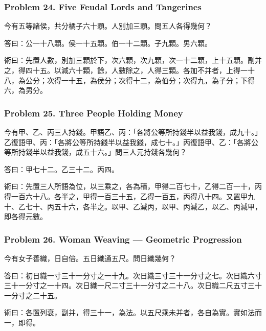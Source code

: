 \documentclass[11pt,a4paper]{article}
\newcommand{\zh}[1]{{\CJKfamily{}#1}}
\begin{document}
\subsubsection*{Problem 24. Five Feudal Lords and Tangerines}

\begin{problembox}[title=\zh{問}]
\zh{今有五等諸侯，共分橘子六十顆。人別加三顆。問五人各得幾何？}
\end{problembox}
\begin{answerbox}[title=\zh{答}]
\zh{答曰：公一十八顆。侯一十五顆。伯一十二顆。子九顆。男六顆。}
\end{answerbox}
\begin{methodbox}[title=\zh{術}]
\zh{術曰：先置人數，別加三顆於下，次六顆，次九顆，次一十二顆，上十五顆。副并之，得四十五。以減六十顆，餘，人數除之，人得三顆。各加不并者，上得一十八，為公分；次得一十五，為侯分；次得十二，為伯分；次得九，為子分；下得六，為男分。}
\end{methodbox}

\subsubsection*{Problem 25. Three People Holding Money}

\begin{problembox}[title=\zh{問}]
\zh{今有甲、乙、丙三人持錢。甲語乙、丙：「各將公等所持錢半以益我錢，成九十。」乙復語甲、丙：「各將公等所持錢半以益我錢，成七十。」丙復語甲、乙：「各將公等所持錢半以益我錢，成五十六。」問三人元持錢各幾何？}
\end{problembox}
\begin{answerbox}[title=\zh{答}]
\zh{答曰：甲七十二。乙三十二。丙四。}
\end{answerbox}
\begin{methodbox}[title=\zh{術}]
\zh{術曰：先置三人所語為位，以三乘之，各為積，甲得二百七十，乙得二百一十，丙得一百六十八。各半之，甲得一百三十五，乙得一百五，丙得八十四。又置甲九十、乙七十、丙五十六，各半之。以甲、乙減丙，以甲、丙減乙，以乙、丙減甲，即各得元數。}
\end{methodbox}

\subsubsection*{Problem 26. Woman Weaving --- Geometric Progression}

\begin{problembox}[title=\zh{問}]
\zh{今有女子善織，日自倍。五日織通五尺。問日織幾何？}
\end{problembox}
\begin{answerbox}[title=\zh{答}]
\zh{答曰：初日織一寸三十一分寸之一十九。次日織三寸三十一分寸之七。次日織六寸三十一分寸之一十四。次日織一尺二寸三十一分寸之二十八。次日織二尺五寸三十一分寸之二十五。}
\end{answerbox}
\begin{methodbox}[title=\zh{術}]
\zh{術曰：各置列衰，副并，得三十一，為法。以五尺乘未并者，各自為實。實如法而一，即得。}
\end{methodbox}
\end{document}
